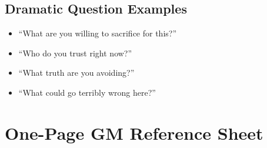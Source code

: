 \documentclass[11pt]{article}
\begin{document}
\subsection{Dramatic Question Examples}
\begin{itemize}
    \item ``What are you willing to sacrifice for this?''
    \item ``Who do you trust right now?''
    \item ``What truth are you avoiding?''
    \item ``What could go terribly wrong here?''
\end{itemize}


\section{One-Page GM Reference Sheet}
\label{appendix:gm-reference}
\end{document}
